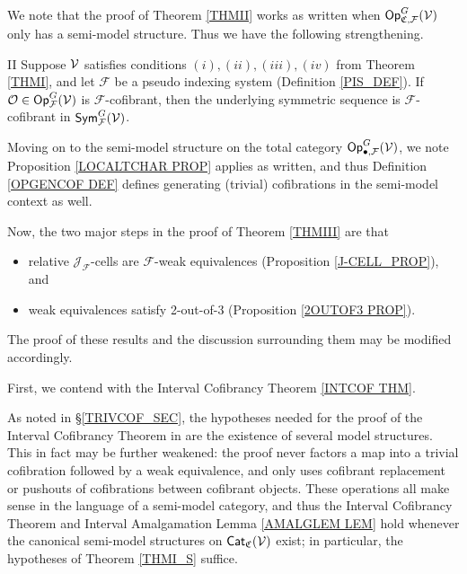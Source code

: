 \documentclass[a4paper,10pt
]{article}%
\renewcommand{\F}{\mathcal F}
\renewcommand{\1}{\eta}%
\begin{document}
We note that the proof of Theorem \ref{THMII} works as written when $\Op_{\mathfrak C, \F}^G(\V)$ only has a semi-model structure.
Thus we have the following strengthening.
\begin{customthm}{II}\label{THMII-S}
	Suppose $\mathcal V$ satisfies conditions $(i),(ii),(iii),(iv)$ from Theorem \ref{THMI},
	and let $\F$ be a pseudo indexing system (Definition \ref{PIS_DEF}).
	If $\O \in \Op^G_\F(\V)$ is $\F$-cofibrant, then the underlying symmetric sequence is $\F$-cofibrant in $\Sym^G_\F(\V)$.
\end{customthm}



Moving on to the semi-model structure on the total category $\Op_{\bullet, \F}^G(\V)$,
we note Proposition \ref{LOCALTCHAR PROP} applies as written, and thus
Definition \ref{OPGENCOF DEF} defines generating (trivial) cofibrations in the semi-model context as well.

Now, the two major steps in the proof of Theorem \ref{THMIII} are that
\begin{itemize}
\item relative $\mathcal J_\F$-cells are $\F$-weak equivalences (Proposition \ref{J-CELL_PROP}), and
\item weak equivalences satisfy 2-out-of-3 (Proposition \ref{2OUTOF3 PROP}).
\end{itemize}
The proof of these results and the discussion surrounding them may be modified accordingly. %

First, we contend with the Interval Cofibrancy Theorem \ref{INTCOF THM}.
\begin{remark}
      As noted in \S \ref{TRIVCOF_SEC}, the hypotheses needed for the proof of the Interval Cofibrancy Theorem in \cite{BM13}
      are the existence of several model structures.
      This in fact may be further weakened:
      the proof never factors a map into a trivial cofibration followed by a weak equivalence,
      and only uses cofibrant replacement or pushouts of cofibrations between cofibrant objects.
      These operations all make sense in the language of a semi-model category,
      and thus the Interval Cofibrancy Theorem and Interval Amalgamation Lemma \ref{AMALGLEM LEM}
      hold whenever the canonical semi-model structures on $\mathsf{Cat}_{\mathfrak C}(\mathcal V)$ exist;
      in particular, the hypotheses of Theorem \ref{THMI_S} suffice.
\end{remark}
\end{document}
